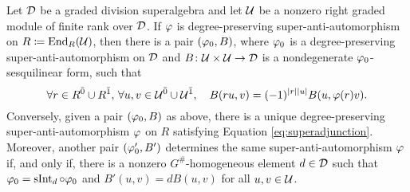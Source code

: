 





\begin{thm}\label{thm:vphi-iff-vphi0-and-B}
    Let $\mathcal{D}$ be a graded division superalgebra and let $\mathcal U$ be a nonzero right graded module of finite rank over $\mathcal{D}$. 
    If $\varphi$ is degree-preserving super-anti-automorphism on $R \coloneqq \operatorname{End}_R(\mathcal U)$, then there is a pair $(\varphi_0, B)$, where $\varphi_0$ is a degree-preserving super-anti-automorphism on $\mathcal{D}$ and $B\colon \mathcal U \times \mathcal U \to \mathcal{D}$ is a nondegenerate $\varphi_0$-sesquilinear form, such that
    \begin{equation}\label{eq:superadjunction}
        \forall r\in R^{\bar0} \cup R^{\bar1},\,\forall u, v \in \mathcal U^{\bar0} \cup \mathcal U^{\bar1},  \quad B(ru,v) = (-1)^{|r||u|} B(u,\varphi(r)v).
    \end{equation}
    Conversely, given a pair $(\varphi_0, B)$ as above, there is a unique degree-preserving super-anti-automorphism $\varphi$ on $R$ satisfying Equation \eqref{eq:superadjunction}. 
    Moreover, another pair $(\varphi_0', B')$ determines the same super-anti-automorphism $\varphi$ if, and only if, there is a nonzero $G^\#$-homogeneous element $d\in \mathcal{D}$ such that $\varphi_0 = \operatorname{sInt}_d \circ \varphi_0$ and $B'(u, v) = dB (u, v)$ for all $u, v \in \mathcal U$.
\end{thm}


